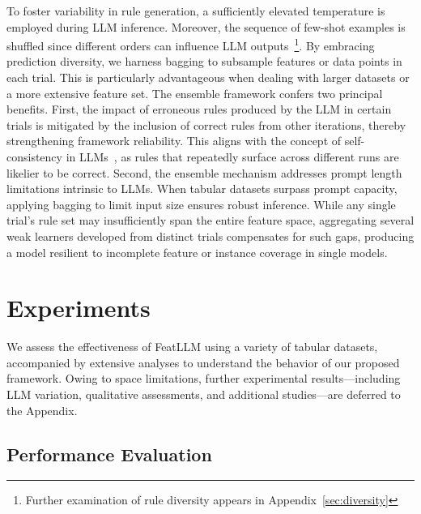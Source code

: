 To foster variability in rule generation, a sufficiently elevated temperature is employed during LLM inference. Moreover, the sequence of few-shot examples is shuffled since different orders can influence LLM outputs~\cite{lu2022fantastically}\footnote{Further examination of rule diversity appears in Appendix~\ref{sec:diversity}}. By embracing prediction diversity, we harness bagging to subsample features or data points in each trial. This is particularly advantageous when dealing with larger datasets or a more extensive feature set. The ensemble framework confers two principal benefits. First, the impact of erroneous rules produced by the LLM in certain trials is mitigated by the inclusion of correct rules from other iterations, thereby strengthening framework reliability. This aligns with the concept of self-consistency in LLMs~\cite{wang2022self}, as rules that repeatedly surface across different runs are likelier to be correct. Second, the ensemble mechanism addresses prompt length limitations intrinsic to LLMs. When tabular datasets surpass prompt capacity, applying bagging to limit input size ensures robust inference. While any single trial's rule set may insufficiently span the entire feature space, aggregating several weak learners developed from distinct trials compensates for such gaps, producing a model resilient to incomplete feature or instance coverage in single models.

\section{Experiments}
We assess the effectiveness of \textsf{FeatLLM} using a variety of tabular datasets, accompanied by extensive analyses to understand the behavior of our proposed framework. Owing to space limitations, further experimental results—including LLM variation, qualitative assessments, and additional studies—are deferred to the Appendix.

\subsection{Performance Evaluation}
